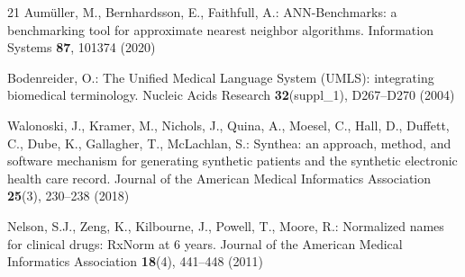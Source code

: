 \documentclass[runningheads]{llncs}
\begin{document}
\begin{thebibliography}{21}
Aum\"uller, M., Bernhardsson, E., Faithfull, A.: ANN-Benchmarks: a benchmarking tool for approximate nearest neighbor algorithms. Information Systems \textbf{87}, 101374 (2020)

Bodenreider, O.: The Unified Medical Language System (UMLS): integrating biomedical terminology. Nucleic Acids Research \textbf{32}(suppl\_1), D267--D270 (2004)

Walonoski, J., Kramer, M., Nichols, J., Quina, A., Moesel, C., Hall, D., Duffett, C., Dube, K., Gallagher, T., McLachlan, S.: Synthea: an approach, method, and software mechanism for generating synthetic patients and the synthetic electronic health care record. Journal of the American Medical Informatics Association \textbf{25}(3), 230--238 (2018)

Nelson, S.J., Zeng, K., Kilbourne, J., Powell, T., Moore, R.: Normalized names for clinical drugs: RxNorm at 6 years. Journal of the American Medical Informatics Association \textbf{18}(4), 441--448 (2011)

\end{thebibliography}
\end{document}
